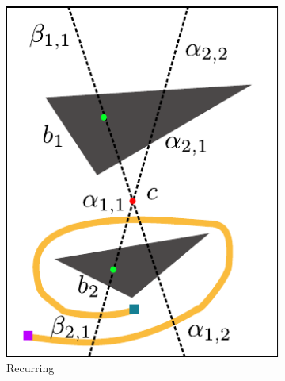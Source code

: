 \documentclass[letterpaper, 10 pt, conference]{ieeeconf}
\begin{document}
\begin{figure}
\begin{subfigure}[t]{0.45\linewidth}
		\includegraphics[width=\textwidth]{fig/recurring}
		\caption{Recurring}
		\label{fig:grammar:recurring}
	\end{subfigure}  
	\begin{subfigure}[t]{0.45\linewidth}
		\centering

\end{subfigure}
\end{figure}
\end{document}
